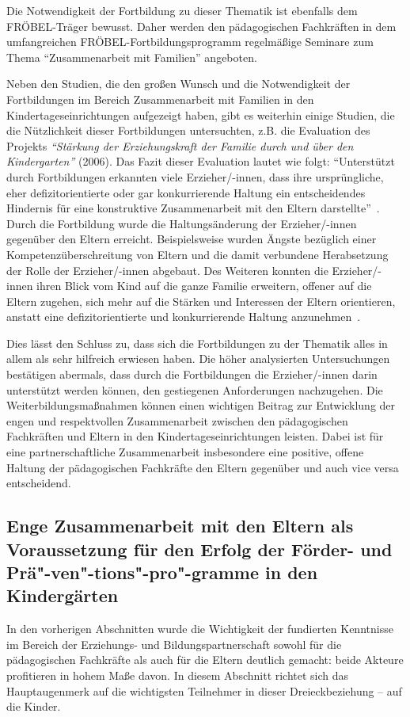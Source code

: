 \documentclass[12pt,a4paper]{article}
\begin{document}
Die Notwendigkeit der Fortbildung zu dieser Thematik ist ebenfalls dem FRÖBEL-Träger bewusst. Daher werden den pädagogischen Fachkräften in dem umfangreichen FRÖBEL-Fortbildungsprogramm regelmäßige Seminare zum Thema "`Zusammenarbeit mit Familien"' angeboten.

Neben den Studien, die den großen Wunsch und die Notwendigkeit der Fortbildungen im Bereich Zusammenarbeit mit Familien in den Kindertageseinrichtungen aufgezeigt haben,  gibt es weiterhin einige Studien, die die Nützlichkeit dieser Fortbildungen untersuchten, z.B. die Evaluation des Projekts \textit{"`Stärkung der Erziehungskraft der Familie durch und über den Kindergarten"'} (2006). Das Fazit dieser Evaluation lautet wie folgt:  "`Unterstützt durch Fortbildungen erkannten viele Erzieher/-innen, dass ihre ursprüngliche, eher defizitorientierte oder gar konkurrierende Haltung ein entscheidendes Hindernis für eine konstruktive Zusammenarbeit mit den Eltern darstellte"'~\parencite[S.~8]{Froelich}. Durch die Fortbildung wurde die Haltungsänderung der Erzieher/-innen gegenüber den Eltern erreicht. Beispielsweise wurden Ängste bezüglich einer Kompetenzüberschreitung von Eltern und die damit verbundene Herabsetzung der Rolle der Erzieher/-innen abgebaut. Des Weiteren konnten die Erzieher/-innen ihren Blick vom Kind auf die ganze Familie erweitern, offener auf die Eltern zugehen, sich mehr auf die Stärken und Interessen der Eltern orientieren, anstatt eine defizitorientierte und konkurrierende Haltung anzunehmen~\parencite[S.~8]{Froelich}.

Dies lässt den Schluss zu, dass sich die Fortbildungen zu der Thematik alles in allem als sehr hilfreich erwiesen haben. Die höher analysierten Untersuchungen bestätigen abermals, dass durch die Fortbildungen die Erzieher/-innen darin unterstützt werden können, den gestiegenen Anforderungen nachzugehen. Die Weiterbildungsmaßnahmen können einen wichtigen Beitrag zur Entwicklung der engen und respektvollen Zusammenarbeit zwischen den pädagogischen Fachkräften und Eltern in den Kindertageseinrichtungen leisten. Dabei ist für eine partnerschaftliche Zusammenarbeit insbesondere eine positive, offene Haltung der pädagogischen Fachkräfte den Eltern gegenüber und auch vice versa entscheidend.

\subsection{Enge Zusammenarbeit mit den Eltern als Voraussetzung für den Erfolg der Förder- und Prä"-ven"-tions"-pro"-gramme in den Kindergärten}
\label{prog}
In den vorherigen Abschnitten wurde die Wichtigkeit der fundierten Kenntnisse im Bereich der Erziehungs- und Bildungspartnerschaft sowohl für die pädagogischen Fachkräfte als auch für die Eltern deutlich gemacht: beide Akteure profitieren in hohem Maße davon. In diesem Abschnitt richtet sich das Hauptaugenmerk auf die wichtigsten Teilnehmer in dieser Dreieckbeziehung – auf die Kinder.
\end{document}
